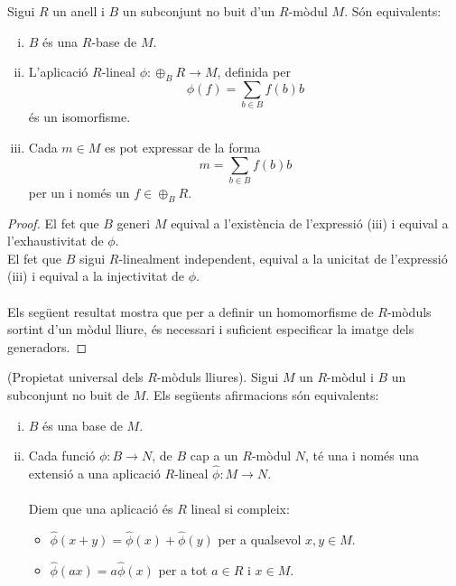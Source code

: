 \begin{theorem}
Sigui $R$ un anell i $B$ un subconjunt no buit d'un $R$-mòdul $M$. Són equivalents:
\begin{enumerate}[(i)]
\item $B$ és una $R$-base de $M$.
\item L'aplicació $R$-lineal $\phi: \oplus_BR\rightarrow M$, definida per 
$$
\phi(f)=\sum_{b\in B}f(b)b
$$
és un isomorfisme.
\item Cada $m\in M$ es pot expressar de la forma
$$
m=\sum_{b\in B}f(b)b
$$
per un i només un $f\in \oplus_BR$.
\end{enumerate} 
\end{theorem}

\begin{proof} El fet que $B$ generi $M$ equival a l'existència de l'expressió (iii) i equival a l'exhaustivitat de $\phi$. \\
El fet que $B$ sigui $R$-linealment independent, equival a la unicitat de l'expressió (iii) i equival a la injectivitat de $\phi$.
\\ \\
Els següent resultat mostra que per a definir un homomorfisme de $R$-mòduls sortint d'un mòdul lliure, és necessari i suficient especificar la imatge dels generadors. 
\end{proof}

\begin{prop}{(Propietat universal dels $R$-mòduls lliures).} \label{morfismebase} Sigui $M$ un $R$-mòdul i $B$ un subconjunt no buit de $M$. Els següents afirmacions són equivalents:
\begin{enumerate}[(i)]
\item $B$ és una base de $M$.
\item Cada funció $\phi:B\rightarrow N$, de $B$ cap a un $R$-mòdul $N$, té una i només una extensió a una aplicació $R$-lineal $\hat{\phi}:M\rightarrow N$. \\ \\
Diem que una aplicació és $R$ lineal si compleix:
\begin{itemize}
\item $\hat{\phi}(x+y)=\hat{\phi}(x)+\hat{\phi}(y)$ per a qualsevol $x,y \in M$.
\item $\hat{\phi}(ax)=a\hat{\phi}(x)$ per a tot $a\in R$ i $x\in M$.
\end{itemize}
\end{enumerate} 
\end{prop}

